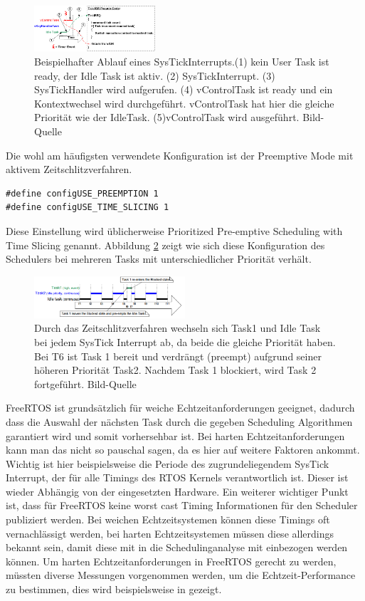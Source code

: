 \begin{figure}[htb]
	\centering
		\includegraphics[width=0.4\textwidth]{Pictures/FreeRTOSOrg/TickISR.png}
	\caption{Beispielhafter Ablauf eines SysTickInterrupts.(1) kein User Task ist ready, der Idle Task ist aktiv. (2) SysTickInterrupt. (3) SysTickHandler wird aufgerufen. (4) vControlTask ist ready und ein Kontextwechsel wird durchgeführt. vControlTask hat hier die gleiche Priorität wie der IdleTask. (5)vControlTask wird ausgeführt. Bild-Quelle~\protect{}}
	\label{fig:SysTick}
\end{figure}
\newline
Die wohl am häufigsten verwendete Konfiguration ist der Preemptive Mode mit aktivem Zeitschlitzverfahren.
\begin{lstlisting}[numbers = none]
#define configUSE_PREEMPTION 1
#define configUSE_TIME_SLICING 1
\end{lstlisting}
Diese Einstellung wird üblicherweise Prioritized Pre-emptive Scheduling with Time Slicing genannt. Abbildung \ref{fig:timeslice} zeigt wie sich diese Konfiguration des Schedulers bei mehreren Tasks mit unterschiedlicher Priorität verhält.
\begin{figure}[htb]
	\centering
		\includegraphics[width=0.5\textwidth]{Pictures/Scheduling/timeslice2.png}
	\caption{Durch das Zeitschlitzverfahren wechseln sich Task1 und Idle Task bei jedem SysTick Interrupt ab, da beide die gleiche Priorität haben. Bei T6 ist Task 1 bereit und verdrängt (preempt) aufgrund seiner höheren Priorität Task2. Nachdem Task 1 blockiert, wird Task 2 fortgeführt. Bild-Quelle~\protect{}}
	\label{fig:timeslice}
\end{figure}
FreeRTOS ist grundsätzlich für weiche Echtzeitanforderungen geeignet, dadurch dass die Auswahl der nächsten Task durch die gegeben Scheduling Algorithmen garantiert wird und somit vorhersehbar ist. Bei harten Echtzeitanforderungen kann man das nicht so pauschal sagen, da es hier auf weitere Faktoren ankommt. Wichtig ist hier beispielsweise die Periode des zugrundeliegendem SysTick Interrupt, der für alle Timings des RTOS Kernels verantwortlich ist. Dieser ist wieder Abhängig von der eingesetzten Hardware. Ein weiterer wichtiger Punkt ist, dass für FreeRTOS keine worst cast Timing Informationen für den Scheduler publiziert werden. Bei weichen Echtzeitsystemen können diese Timings oft vernachlässigt werden, bei harten Echtzeitsystemen müssen diese allerdings bekannt sein, damit diese mit in die Schedulinganalyse mit einbezogen werden können. Um harten Echtzeitanforderungen in FreeRTOS gerecht zu werden, müssten diverse Messungen vorgenommen werden, um die Echtzeit-Performance zu bestimmen, dies wird beispielsweise in \cite{RealTimePerformance} gezeigt.     